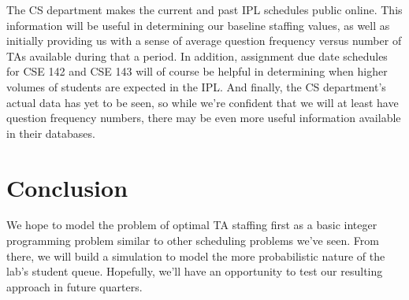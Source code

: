 \documentclass{article}
\begin{document}
\begin{multicols}{2}
The CS department makes the current and past IPL schedules public online. This information will be useful in determining our baseline staffing values, as well as initially providing us with a sense of average question frequency versus number of TAs available during that a period. In addition, assignment due date schedules for CSE 142 and CSE 143 will of course be helpful in determining when higher volumes of students are expected in the IPL. And finally, the CS department’s actual data has yet to be seen, so while we’re confident that we will at least have question frequency numbers, there may be even more useful information available in their databases.

\section*{Conclusion}
We hope to model the problem of optimal TA staffing first as a basic integer programming problem similar to other scheduling problems we've seen. From there, we will build a simulation to model the more probabilistic nature of the lab’s student queue. Hopefully, we'll have an opportunity to test our resulting approach in future quarters.

\end{multicols}
\end{document}
